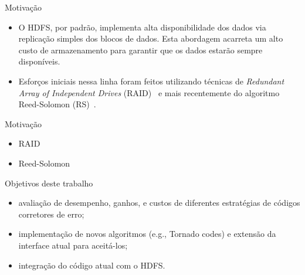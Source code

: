   \begin{frame}{Motivação}
     \begin{itemize}
      \item O HDFS, por padrão, implementa alta disponibilidade dos dados via replicação simples dos blocos de dados. Esta abordagem acarreta um alto custo de armazenamento para garantir que os dados estarão sempre disponíveis.
      \item Esforços iniciais nessa linha foram feitos utilizando técnicas de \emph{Redundant Array of Independent Drives} (RAID)~\cite{Patterson:1988,HDFS-503:2010} e mais recentemente do algoritmo Reed-Solomon (RS)~\cite{Reed:1960,MR-1969:2010,MR-1970:2010}.
     \end{itemize}
  \end{frame}

  \begin{frame}{Motivação}
     \begin{itemize}
        \item RAID
        \item Reed-Solomon
     \end{itemize}
  \end{frame}

  \begin{frame}{Objetivos deste trabalho}

  \begin{itemize}
     \item avaliação de desempenho, ganhos, e custos de diferentes
  estratégias de códigos corretores de erro;
     \item implementação de novos algoritmos (e.g., Tornado codes) e
  extensão da interface atual para aceitá-los;
     \item integração do código atual com o HDFS.
     \end{itemize}
  \end{frame}
